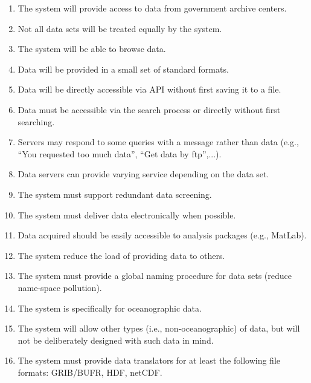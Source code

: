 \begin{enumerate}
\item The system will provide access to data from government archive centers.

\item Not all data sets will be treated equally by the system.

\item The system will be able to browse data.

\item Data will be provided in a small set of standard formats.

\item Data will be directly accessible via API without first saving it to a
file. 

\item Data must be accessible via the search process or directly without first
searching.

\item Servers may respond to some queries with a message rather than data
(e.g., ``You requested too much data'', ``Get data by ftp'',...).

\item Data servers can provide varying service depending on the data set.

\item The system must support redundant data screening.

\item The system must deliver data electronically when possible.

\item Data acquired should be easily accessible to analysis packages (e.g.,
MatLab).

\item The system reduce the load of providing data to others.

\item The system must provide a global naming procedure for data sets (reduce
name-space pollution). 

\item The system is specifically for oceanographic data.

\item The system will allow other types (i.e., non-oceanographic)  of data, but
will not be deliberately designed with such data in mind.

\item The system must provide data translators for at least the following file
formats: GRIB/BUFR, HDF, netCDF.


\end{enumerate}
